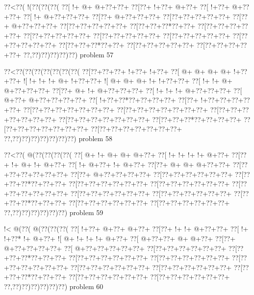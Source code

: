 \vbox{\vbox{\goo
\0??<\0??(\- !(\0??(\0??(\0??(
\0??[\- !+\- @+\- @+\0??+\0??+
\0??[\0??+\- !+\0??+\- @+\0??+
\0??[\- !+\0??+\- @+\0??+\0??+
\0??[\- !+\- @+\0??+\0??+\0??+
\0??[\0??+\- @+\0??+\0??+\0??+
\0??[\0??+\0??+\0??+\0??+\0??+
\0??[\0??+\- @+\0??+\0??+\0??+
\0??[\0??+\0??+\0??+\0??+\0??+
\0??[\0??+\0??+\0??*\0??+\0??+
\0??[\0??+\0??+\0??+\0??+\0??+
\0??[\0??+\0??+\0??+\0??+\0??+
\0??[\0??+\0??+\0??+\0??+\0??+
\0??[\0??+\0??+\0??+\0??+\0??+
\0??[\0??+\0??+\0??+\0??+\0??+
\0??[\0??+\0??+\0??*\0??+\0??+
\0??[\0??+\0??+\0??+\0??+\0??+
\0??[\0??+\0??+\0??+\0??+\0??+
\0??,\0??)\0??)\0??)\0??)\0??)
}
\hfil problem 57\hfil\break
}

\vbox{\vbox{\goo
\0??<\0??(\0??(\0??(\0??(\0??(\0??(\0??(
\0??[\0??+\0??+\0??+\- !+\0??+\- !+\0??+
\0??[\- @+\- @+\- @+\- @+\- !+\0??+\0??+
\- ![\- !+\- !+\- !+\- @+\- !+\0??+\0??+
\- ![\- @+\- @+\- @+\- !+\- !+\0??+\0??+
\0??[\- !+\- !+\- @+\- @+\0??+\0??+\0??+
\0??[\0??+\- @+\- !+\- @+\0??+\0??+\0??+
\0??[\- !+\- !+\- !+\- @+\0??+\0??+\0??+
\0??[\- @+\0??+\- @+\0??+\0??+\0??+\0??+
\0??[\- !+\0??+\0??*\0??+\0??+\0??+\0??+
\0??[\0??+\- !+\0??+\0??+\0??+\0??+\0??+
\0??[\0??+\0??+\0??+\0??+\0??+\0??+\0??+
\0??[\0??+\0??+\0??+\0??+\0??+\0??+\0??+
\0??[\0??+\0??+\0??+\0??+\0??+\0??+\0??+
\0??[\0??+\0??+\0??+\0??+\0??+\0??+\0??+
\0??[\0??+\0??+\0??*\0??+\0??+\0??+\0??+
\0??[\0??+\0??+\0??+\0??+\0??+\0??+\0??+
\0??[\0??+\0??+\0??+\0??+\0??+\0??+\0??+
\0??,\0??)\0??)\0??)\0??)\0??)\0??)\0??)
}
\hfil problem 58\hfil\break
}

\vbox{\vbox{\goo
\0??<\0??(\- @(\0??(\0??(\0??(\0??(
\0??[\- @+\- !+\- @+\- @+\- @+\0??+
\0??[\- !+\- !+\- !+\- !+\- @+\0??+
\0??[\0??+\- !+\- @+\- !+\- @+\0??+
\0??[\- !+\- @+\0??+\- !+\- @+\0??+
\0??[\0??+\- @+\- @+\- @+\0??+\0??+
\0??[\0??+\0??+\0??+\0??+\0??+\0??+
\0??[\0??+\- @+\0??+\0??+\0??+\0??+
\0??[\0??+\0??+\0??+\0??+\0??+\0??+
\0??[\0??+\0??+\0??*\0??+\0??+\0??+
\0??[\0??+\0??+\0??+\0??+\0??+\0??+
\0??[\0??+\0??+\0??+\0??+\0??+\0??+
\0??[\0??+\0??+\0??+\0??+\0??+\0??+
\0??[\0??+\0??+\0??+\0??+\0??+\0??+
\0??[\0??+\0??+\0??+\0??+\0??+\0??+
\0??[\0??+\0??+\0??*\0??+\0??+\0??+
\0??[\0??+\0??+\0??+\0??+\0??+\0??+
\0??[\0??+\0??+\0??+\0??+\0??+\0??+
\0??,\0??)\0??)\0??)\0??)\0??)\0??)
}
\hfil problem 59\hfil\break
}

\vbox{\vbox{\goo
\- !<\- @(\0??(\- @(\0??(\0??(\0??(
\0??[\- !+\0??+\- @+\0??+\- @+\0??+
\0??[\0??+\- !+\- !+\- @+\0??+\0??+
\0??[\- !+\- !+\0??*\- !+\- @+\0??+
\- ![\- @+\- !+\- !+\- !+\- @+\0??+
\0??[\- @+\0??+\0??+\- @+\- @+\0??+
\0??[\0??+\- @+\0??+\0??+\0??+\0??+
\0??[\- @+\0??+\0??+\0??+\0??+\0??+
\0??[\0??+\0??+\0??+\0??+\0??+\0??+
\0??[\0??+\0??+\0??*\0??+\0??+\0??+
\0??[\0??+\0??+\0??+\0??+\0??+\0??+
\0??[\0??+\0??+\0??+\0??+\0??+\0??+
\0??[\0??+\0??+\0??+\0??+\0??+\0??+
\0??[\0??+\0??+\0??+\0??+\0??+\0??+
\0??[\0??+\0??+\0??+\0??+\0??+\0??+
\0??[\0??+\0??+\0??*\0??+\0??+\0??+
\0??[\0??+\0??+\0??+\0??+\0??+\0??+
\0??[\0??+\0??+\0??+\0??+\0??+\0??+
\0??,\0??)\0??)\0??)\0??)\0??)\0??)
}
\hfil problem 60\hfil\break
}

